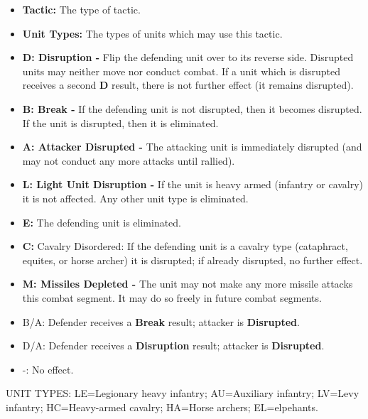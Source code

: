 \begin{minipage}{\textwidth}
  \begin{itemize}
    \item \textbf{Tactic:} The type of tactic.
    \item \textbf{Unit Types:} The types of units which may use this tactic.
    \item \textbf{D: Disruption -} Flip the defending unit over to its reverse side. Disrupted units may neither move nor conduct combat. If a unit which is disrupted receives a second \textbf{D} result, there is not further effect (it remains disrupted).
    \item \textbf{B: Break -} If the defending unit is not disrupted, then it becomes disrupted. If the unit is disrupted, then it is eliminated.
    \item \textbf{A: Attacker Disrupted -} The attacking unit is immediately disrupted (and may not conduct any more attacks until rallied).
    \item \textbf{L: Light Unit Disruption -} If the unit is heavy armed (infantry or cavalry) it is not affected. Any other unit type is eliminated.
    \item \textbf{E: } The defending unit is eliminated.
    \item \textbf{C: } Cavalry Disordered: If the defending unit is a cavalry type (cataphract, equites, or horse archer) it is disrupted; if already disrupted, no further effect.
    \item \textbf{M: Missiles Depleted -} The unit may not make any more missile attacks this combat segment. It may do so freely in future combat segments.
    \item{B/A:} Defender receives a \textbf{Break} result; attacker is \textbf{Disrupted}.
    \item{D/A:} Defender receives a \textbf{Disruption} result; attacker is \textbf{Disrupted}.
    \item{-:} No effect.
  \end{itemize}
  \medskip
  UNIT TYPES: LE=Legionary heavy infantry; AU=Auxiliary infantry; LV=Levy infantry; HC=Heavy-armed cavalry; HA=Horse archers; EL=elpehants.
\end{minipage}

\bigskip
\vfill

